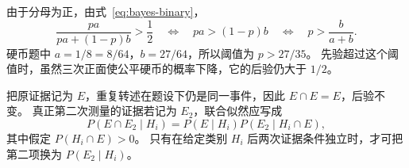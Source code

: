 \documentclass[UTF8]{ctexart}
\begin{document}
\begin{solve}
由于分母为正，由式~\eqref{eq:bayes-binary}，
\[
  \frac{pa}{pa+(1-p)b}>\frac12
  \quad\Longleftrightarrow\quad pa>(1-p)b
  \quad\Longleftrightarrow\quad p>\frac{b}{a+b}.
\]
硬币题中 $a=1/8=8/64$，$b=27/64$，所以阈值为 $p>27/35$。
先验超过这个阈值时，虽然三次正面使公平硬币的概率下降，它的后验仍大于 $1/2$。
\end{solve}

\begin{solve}
把原证据记为 $E$，重复转述在题设下仍是同一事件，因此 $E\cap E=E$，后验不变。
真正第二次测量的证据若记为 $E_2$，联合似然应写成
\[
  P(E\cap E_2\mid H_i)
  =P(E\mid H_i)P(E_2\mid H_i\cap E),
\]
其中假定 $P(H_i\cap E)>0$。
只有在给定类别 $H_i$ 后两次证据条件独立时，才可把第二项换为 $P(E_2\mid H_i)$。
\end{solve}
\end{document}
